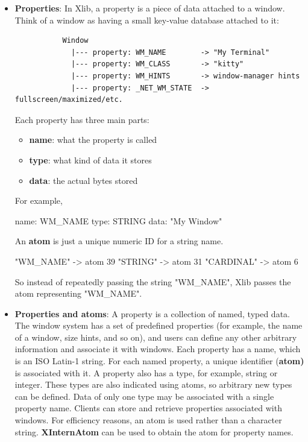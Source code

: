 \documentclass{report}
\begin{document}
\begin{itemize}
    \item \textbf{Properties}: In Xlib, a property is a piece of data attached to a window.
        \bigbreak \noindent 
        Think of a window as having a small key-value database attached to it:
        \bigbreak \noindent 
        \begin{verbatim}
           Window
             |--- property: WM_NAME        -> "My Terminal"
             |--- property: WM_CLASS       -> "kitty"
             |--- property: WM_HINTS       -> window-manager hints
             |--- property: _NET_WM_STATE  -> fullscreen/maximized/etc. 
        \end{verbatim}
        \bigbreak \noindent 
        Each property has three main parts:
        \begin{itemize}
            \item \textbf{name}:   what the property is called
            \item \textbf{type}:   what kind of data it stores
            \item \textbf{data}:   the actual bytes stored
        \end{itemize}
        For example, 
        \bigbreak \noindent 
        \begin{cppcode}
            name: WM_NAME
            type: STRING
            data: "My Window"
        \end{cppcode}
        \bigbreak \noindent 
        An \textbf{atom} is just a unique numeric ID for a string name.
        \bigbreak \noindent 
        \begin{cppcode}
            "WM_NAME"  -> atom 39
            "STRING"   -> atom 31
            "CARDINAL" -> atom 6
        \end{cppcode}
        \bigbreak \noindent 
        So instead of repeatedly passing the string "WM\_NAME", Xlib passes the atom representing "WM\_NAME".
    \item \textbf{Properties and atoms}: A property is a collection of named, typed data. The window system has a set of predefined properties (for example, the name of a window, size hints, and so on), and users can define any other arbitrary information and associate it with windows. Each property has a name, which is an ISO Latin-1 string. For each named property, a unique identifier (\textbf{atom)} is associated with it. A property also has a type, for example, string or integer. These types are also indicated using atoms, so arbitrary new types can be defined. Data of only one type may be associated with a single property name. Clients can store and retrieve properties associated with windows. For efficiency reasons, an atom is used rather than a character string. \textbf{XInternAtom} can be used to obtain the atom for property names.

\end{itemize}
\end{document}
